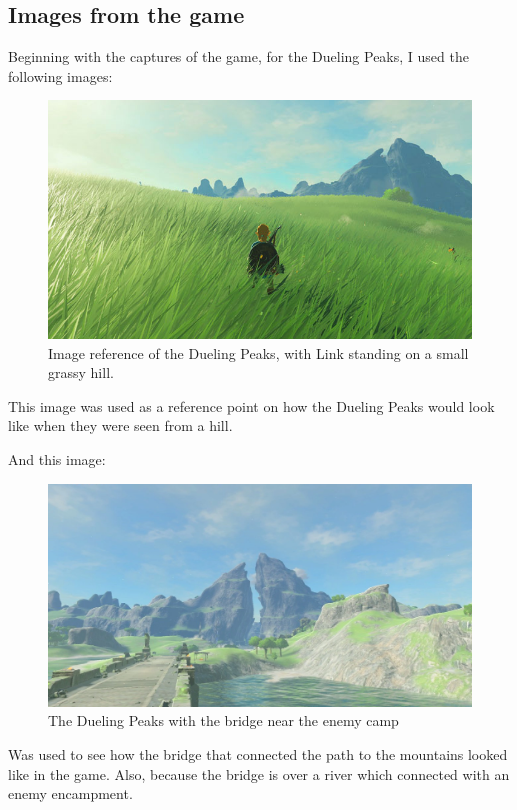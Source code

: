 \documentclass{cup-pan}
\begin{document}
    \subsection{Images from the game}
    Beginning with the captures of the game, for the Dueling Peaks, I used the following images:\\
        \begin{figure}[H]
            \includegraphics[width=\textwidth]{Imagenes/Referencias/article_img03_1.jpg}
            \caption{Image reference of the Dueling Peaks, with Link standing on a small grassy hill.}
        \end{figure}
    This image was used as a reference point on how the Dueling Peaks would look like when they were seen from a hill. 

    And this image: 
        \begin{figure}[H]
            \includegraphics[width=\textwidth]{Imagenes/Referencias/Dueling_Peaks.png}
            \caption{The Dueling Peaks with the bridge near the enemy camp}
        \end{figure}
    Was used to see how the bridge that connected the path to the mountains looked like in the game.
    Also, because the bridge is over a river which connected with an enemy encampment. 
\end{document}
